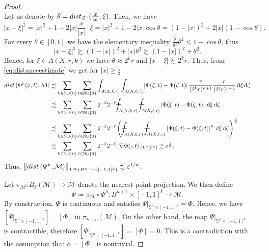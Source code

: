 \documentclass[10pt,a4paper]{amsart}
\def\B{{B}}
\def\N{{\mathbb N}}
\def\S{{\mathbb S}}
\def\dist{{\rm dist\,}}
\def\eps{\varepsilon}
\def\n{{\mathcal M}}
\newcommand{\abs}[1]{\left |#1 \right |}
\newcommand{\ageq}{\succsim}
\newcommand{\aleq}{\precsim}
\newcommand{\barint}{
\rule[.036in]{.12in}{.009in}\kern-.16in \displaystyle\int }
\newcommand{\brac}[1]{\left (#1 \right )}
\newcommand{\dif}{\,\mathrm{d}}
\begin{document}
\begin{proof}
\[\]
Let us denote by $\theta = \dist_{\S^n}(\frac{x}{|x|},\xi)$. Then, we have
\[
 |x-\xi|^2 = |x|^2+1-2|x|\frac{x}{|x|}\cdot \xi = |x|^2+1-2|x|\cos\theta = (1-|x|)^2+2|x|(1-\cos\theta).
 \]
For every $\theta\in[0,1]$ we have the elementary inequality $\frac{2}{\pi^2}\theta^2\leq 1-\cos \theta$, thus
\[
 |x-\xi|^2\ageq (1-|x|)^2+|x|\theta^2 \ageq (1-|x|)^2 + \theta^2.
\]
Hence, for $\xi \in A(X,r,k)$ we have $\theta \approx 2^k r$ and $|x-\xi|\ageq 2^k r$. Thus, from \eqref{eq:distanceestimate} we get for $|x|\ge \frac 12$
\[
\begin{split}
 \dist(\Phi^h(x,t),\n) 
 &\aleq \sum_{k\in \N\cup\{0\}}\sum_{\ell\in\N\cup\{0\}}\int_{A(X,k,r)}\int_{A(X,\ell,r)} \abs{\Phi(\xi,t) - \Phi(\zeta,t)}\frac{r}{(2^k r)^{n+1}}\frac{r}{(2^\ell r)^{n+1}}\dif \xi \dif \zeta\\
 &\aleq \sum_{k\in \N\cup\{0\}}\sum_{\ell\in\N\cup\{0\}}2^{-k} 2^{-\ell}\barint_{A(X,k,r)}\barint_{A(X,\ell,r)} \abs{\Phi(\xi,t) - \Phi(\zeta,t)}\dif \xi \dif \zeta\\
 &\aleq \sum_{k\in \N\cup\{0\}}\sum_{\ell\in\N\cup\{0\}}2^{-k} 2^{-\ell} \brac{\barint_{A(X,k,r)}\barint_{A(X,\ell,r)} \abs{\Phi(\xi,t) - \Phi(\zeta,t)}^n\dif \xi \dif \zeta}^\frac{1}{n}\\
 &\aleq \sum_{k\in \N\cup\{0\}}\sum_{\ell\in\N\cup\{0\}}2^{-k} 2^{-\ell} \|\nabla \Phi(\cdot,t)\|_{L^n(\S^n)} \aleq \eps^{\frac 1n}.
 \end{split}
\]
Thus, $\left\| \dist(\Phi^h,\n) \right\|_{L^{\infty}(B^{n+1}\times[-1,1]^k)} \aleq \eps^{1/n}$.


Let $\pi_{\n}\colon B_{\delta}(\n) \to \n$ denote the nearest point projection. We then define
\[
 \Psi\coloneqq \pi_{\n} \circ \Phi^h \colon \B^{n+1} \times [-1,1]^k \to \n.
\]
By construction, $\Psi$ is continuous and satisfies
$
\Psi  \rvert_{\S^n\times [-1,1]^k} = \Phi.
$
Hence, we have $\left[\Psi \rvert_{\S^n\times [-1,1]^k} \right] = [\Phi]$ in $\pi_{k+n}(\n)$. On the other hand, the map $\Psi\rvert_{\S^n\times [-1,1]^k}$ is contractible, therefore $\left[\Psi\rvert_{\S^n\times [-1,1]^k} \right]=[\Phi]=0$. This is a contradiction with the assumption that $\alpha=[\Phi]$ is nontrivial.
\end{proof}
\end{document}
